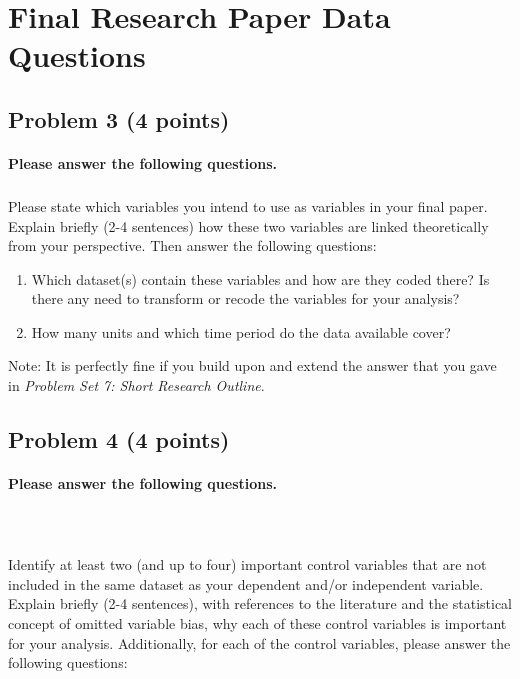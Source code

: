 \documentclass[12pt]{article}
\begin{document}
\section*{Final Research Paper Data Questions}

\subsection*{Problem 3 (4 points)}

\paragraph{Please answer the following questions.}

\subparagraph{} Please state which variables you intend to use as variables in your final paper. Explain briefly (2-4 sentences) how these two variables are linked theoretically from your perspective. Then answer the following questions:

\begin{enumerate}
	\item Which dataset(s) contain these variables and how are they coded there? Is there any need to transform or recode the variables for your analysis?
	\item How many units and which time period do the data available cover?
\end{enumerate}

Note: It is perfectly fine if you build upon and extend the answer that you gave in \textit{Problem Set 7: Short Research Outline}.



\subsection*{Problem 4 (4 points)}

\paragraph{Please answer the following questions.} \\

\subparagraph{} Identify at least two (and up to four) important control variables that are not included in the same dataset as your dependent and/or independent variable. Explain briefly (2-4 sentences), with references to the literature and the statistical concept of omitted variable bias, why each of these control variables is important for your analysis. Additionally, for each of the control variables, please answer the following questions:
\end{document}
